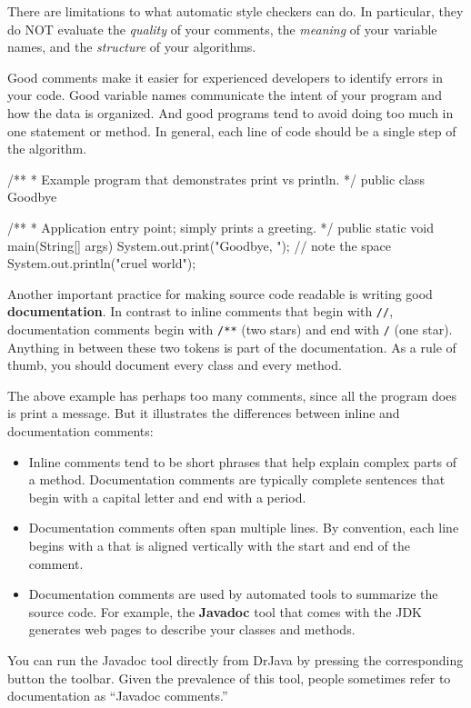 There are limitations to what automatic style checkers can do.
In particular, they do NOT evaluate the {\em quality} of your comments, the {\em meaning} of your variable names, and the {\em structure} of your algorithms.

Good comments make it easier for experienced developers to identify errors in your code.
Good variable names communicate the intent of your program and how the data is organized.
And good programs tend to avoid doing too much in one statement or method.
In general, each line of code should be a single step of the algorithm.

\begin{code}
/**
 * Example program that demonstrates print vs println.
 */
public class Goodbye {

    /**
     * Application entry point; simply prints a greeting.
     */
    public static void main(String[] args) {
        System.out.print("Goodbye, ");  // note the space
        System.out.println("cruel world");
    }

}
\end{code}


Another important practice for making source code readable is writing good {\bf documentation}.
In contrast to inline comments that begin with {\tt //}, documentation comments begin with {\tt /**} (two stars) and end with {\tt */} (one star).
Anything in between these two tokens is part of the documentation.
As a rule of thumb, you should document every class and every method.

The above example has perhaps too many comments, since all the program does is print a message.
But it illustrates the differences between inline and documentation comments:

\begin{itemize}
\item Inline comments tend to be short phrases that help explain complex parts of a method.
Documentation comments are typically complete sentences that begin with a capital letter and end with a period.

\item Documentation comments often span multiple lines.
By convention, each line begins with a {\tt *} that is aligned vertically with the start and end of the comment.



\item Documentation comments are used by automated tools to summarize the source code.
For example, the {\bf Javadoc} tool that comes with the JDK generates web pages to describe your classes and methods.

\end{itemize}

You can run the Javadoc tool directly from DrJava by pressing the corresponding button the toolbar.
Given the prevalence of this tool, people sometimes refer to documentation as ``Javadoc comments.''
